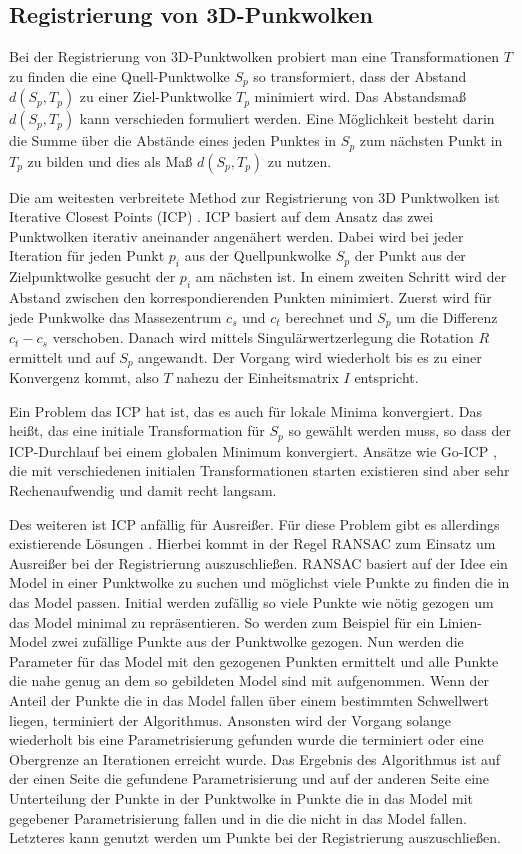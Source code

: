 \documentclass[12pt,titlepage, twoside]{article}
\begin{document}
\subsection{Registrierung von 3D-Punkwolken}
\label{sec:stand:registrierung}

Bei der Registrierung von 3D-Punktwolken probiert man eine Transformationen $T$ zu finden die eine Quell-Punktwolke $S_p$ so transformiert, dass der Abstand $d(S_p,T_p)$ zu einer Ziel-Punktwolke $T_p$ minimiert wird.
Das Abstandsmaß $d(S_p, T_p)$ kann verschieden formuliert werden. Eine Möglichkeit besteht darin die Summe über die Abstände eines jeden Punktes in $S_p$ 
zum nächsten Punkt in $T_p$ zu bilden und dies als Maß $d(S_p, T_p)$ zu nutzen.

Die am weitesten verbreitete Method zur Registrierung von 3D Punktwolken ist Iterative Closest Points (ICP) \cite{icp_org}. ICP basiert auf dem Ansatz das zwei Punktwolken iterativ aneinander angenähert werden.
Dabei wird bei jeder Iteration für jeden Punkt $p_i$ aus der Quellpunkwolke $S_p$ der Punkt aus der Zielpunktwolke gesucht der $p_i$ am nächsten ist. In einem zweiten Schritt wird der Abstand zwischen den korrespondierenden Punkten minimiert.
Zuerst wird für jede Punkwolke das Massezentrum $c_s$ und $c_t$ berechnet und $S_p$ um die Differenz $c_t - c_s$ verschoben. Danach wird mittels Singulärwertzerlegung die Rotation $R$ ermittelt und auf $S_p$ angewandt.
Der Vorgang wird wiederholt bis es zu einer Konvergenz kommt, also $T$ nahezu der Einheitsmatrix $I$ entspricht.

Ein Problem das ICP hat ist, das es auch für lokale Minima konvergiert. Das heißt, das eine initiale Transformation für $S_p$ so gewählt werden muss, so dass der ICP-Durchlauf bei einem globalen Minimum konvergiert.
Ansätze wie Go-ICP \cite{GoICP}, die mit verschiedenen initialen Transformationen starten existieren sind aber sehr Rechenaufwendig und damit recht langsam.

Des weiteren ist ICP anfällig für Ausreißer. Für diese Problem gibt es allerdings existierende Lösungen \cite{ICP}. Hierbei kommt in der Regel RANSAC \cite{RANSAC} zum Einsatz um Ausreißer bei der Registrierung auszuschließen.
RANSAC basiert auf der Idee ein Model in einer Punktwolke zu suchen und möglichst viele Punkte zu finden die in das Model passen. Initial werden zufällig so viele Punkte wie nötig gezogen um das Model minimal zu repräsentieren. 
So werden zum Beispiel für ein Linien-Model zwei zufällige Punkte aus der Punktwolke gezogen. Nun werden die Parameter für das Model mit den gezogenen Punkten ermittelt und alle Punkte die nahe genug an dem so gebildeten Model sind mit aufgenommen.
Wenn der Anteil der Punkte die in das Model fallen über einem bestimmten Schwellwert liegen, terminiert der Algorithmus. 
Ansonsten wird der Vorgang solange wiederholt bis eine Parametrisierung gefunden wurde die terminiert oder eine Obergrenze an Iterationen erreicht wurde.
Das Ergebnis des Algorithmus ist auf der einen Seite die gefundene Parametrisierung und auf der anderen Seite eine Unterteilung der Punkte in der Punktwolke in Punkte die in das Model mit gegebener Parametrisierung fallen und in die die nicht in das Model fallen.
Letzteres kann genutzt werden um Punkte bei der Registrierung auszuschließen.
\end{document}
